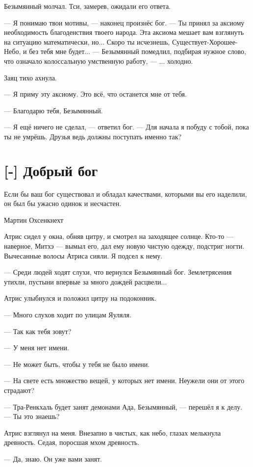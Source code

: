 Безымянный молчал.
Тси, замерев, ожидали его ответа.

--- Я понимаю твои мотивы, --- наконец произнёс бог.
--- Ты принял за аксиому необходимость благоденствия твоего народа.
Эта аксиома мешает вам взглянуть на ситуацию математически, но...
Скоро ты исчезнешь, Существует-Хорошее-Небо, и без тебя мне будет... --- Безымянный помедлил, подбирая нужное слово, что означало колоссальную умственную работу, --- ... холодно.

Заяц тихо ахнула.

--- Я приму эту аксиому.
Это всё, что останется мне от тебя.

--- Благодарю тебя, Безымянный.

--- Я ещё ничего не сделал, --- ответил бог.
--- Для начала я побуду с тобой, пока ты не умрёшь.
Друзья ведь должны поступать именно так?

\section{[-] Добрый бог}

\epigraph
{Если бы ваш бог существовал и обладал качествами, которыми вы его наделили, он был бы ужасно одинок и несчастен.}
{Мартин Охсенкнехт}

\textspace

Атрис сидел у окна, обняв цитру, и смотрел на заходящее солнце.
Кто-то --- наверное, Митхэ --- вымыл его, дал ему новую чистую одежду, подстриг ногти.
Вычесанные волосы Атриса сияли.
Я подсел к нему.

--- Среди людей ходят слухи, что вернулся Безымянный бог.
Землетрясения утихли, пустыни впервые за много дождей расцвели...

Атрис улыбнулся и положил цитру на подоконник.

--- Много слухов ходит по улицам Яуляля.

--- Так как тебя зовут?

--- У меня нет имени.

--- Не может быть, чтобы у тебя не было имени.

--- На свете есть множество вещей, у которых нет имени.
Неужели они от этого страдают?

--- Тра-Ренкхаль будет занят демонами Ада, Безымянный, --- перешёл я к делу.
--- Ты это знаешь?

Атрис взглянул на меня.
Внезапно в чистых, как небо, глазах мелькнула древность.
Седая, поросшая мхом древность.

--- Да, знаю.
Он уже вами занят.

